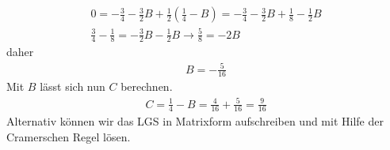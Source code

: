 \documentclass[11pt,a4paper,DIV=12]{scrartcl}
\begin{document}
%
\begin{gather}
	0 = - \frac{3}{4} -\frac{3}{2}B + \frac{1}{2} (\frac{1}{4} - B)
	=- \frac{3}{4} -\frac{3}{2}B + \frac{1}{8} - \frac{1}{2} B\\
	\frac{3}{4} - \frac{1}{8} =  - \frac{3}{2}B - \frac{1}{2} B \rightarrow\frac{5}{8} =  -  2 B
\end{gather}
%
%
daher
%
\begin{gather}
	B = -\frac{5}{16}
\end{gather}
%
Mit $B$ lässt sich nun $C$ berechnen.
%
\begin{gather}
	C = \frac{1}{4} - B = \frac{4}{16} + \frac{5}{16} = \frac{9}{16}
\end{gather}
%
Alternativ können wir das LGS in Matrixform aufschreiben und mit Hilfe der
Cramerschen Regel lösen.
\end{document}
